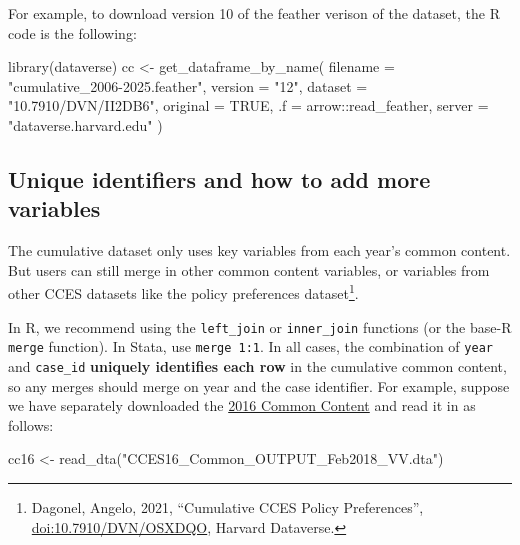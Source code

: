\documentclass[10pt,article,oneside]{memoir}
\newenvironment{Shaded}{\begin{snugshade}}{\end{snugshade}}
\newcommand{\AttributeTok}[1]{\textcolor[rgb]{0.40,0.45,0.13}{#1}}
\newcommand{\ConstantTok}[1]{\textcolor[rgb]{0.56,0.35,0.01}{#1}}
\newcommand{\FunctionTok}[1]{\textcolor[rgb]{0.28,0.35,0.67}{#1}}
\newcommand{\NormalTok}[1]{\textcolor[rgb]{0.00,0.23,0.31}{#1}}
\newcommand{\OtherTok}[1]{\textcolor[rgb]{0.00,0.23,0.31}{#1}}
\newcommand{\SpecialCharTok}[1]{\textcolor[rgb]{0.37,0.37,0.37}{#1}}
\newcommand{\StringTok}[1]{\textcolor[rgb]{0.13,0.47,0.30}{#1}}
\begin{document}
For example, to download version 10 of the feather verison of the
dataset, the R code is the following:

\begin{Shaded}
\begin{Highlighting}[]
\FunctionTok{library}\NormalTok{(dataverse)}
\NormalTok{cc }\OtherTok{\textless{}{-}} \FunctionTok{get\_dataframe\_by\_name}\NormalTok{(}
  \AttributeTok{filename =} \StringTok{"cumulative\_2006{-}2025.feather"}\NormalTok{,}
  \AttributeTok{version =} \StringTok{"12"}\NormalTok{,}
  \AttributeTok{dataset =} \StringTok{"10.7910/DVN/II2DB6"}\NormalTok{,}
  \AttributeTok{original =} \ConstantTok{TRUE}\NormalTok{,}
  \AttributeTok{.f =}\NormalTok{ arrow}\SpecialCharTok{::}\NormalTok{read\_feather,}
  \AttributeTok{server =} \StringTok{"dataverse.harvard.edu"}
\NormalTok{)}
\end{Highlighting}
\end{Shaded}

\subsection{Unique identifiers and how to add more
variables}\label{unique-identifiers-and-how-to-add-more-variables}

The cumulative dataset only uses key variables from each year's common
content. But users can still merge in other common content variables, or
variables from other CCES datasets like the policy preferences
dataset\footnote{Dagonel, Angelo, 2021, ``Cumulative CCES Policy Preferences'', \href{https://dataverse.harvard.edu/dataset.xhtml?persistentId=doi:10.7910/DVN/OSXDQO}{\url{doi:10.7910/DVN/OSXDQO}}, Harvard Dataverse.}.

In R, we recommend using the \texttt{left\_join} or \texttt{inner\_join}
functions (or the base-R \texttt{merge} function). In Stata, use
\texttt{merge\ 1:1}. In all cases, the combination of \texttt{year} and
\texttt{case\_id} \textbf{uniquely identifies each row} in the
cumulative common content, so any merges should merge on year and the
case identifier. For example, suppose we have separately downloaded the
\href{https://doi.org/10.7910/DVN/GDF6Z0/JPMOZZ}{2016 Common Content}
and read it in as follows:

\begin{Shaded}
\begin{Highlighting}[]
\NormalTok{cc16 }\OtherTok{\textless{}{-}} \FunctionTok{read\_dta}\NormalTok{(}\StringTok{"CCES16\_Common\_OUTPUT\_Feb2018\_VV.dta"}\NormalTok{)}
\end{Highlighting}
\end{Shaded}
\end{document}
